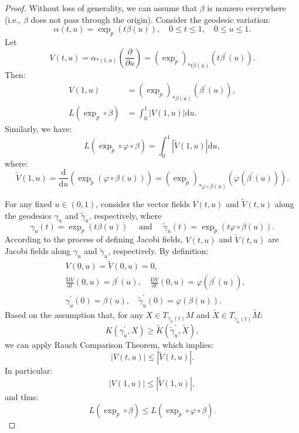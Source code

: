 \documentclass{ctexart}
\begin{document}
\begin{proof}[Proof]
  Without loss of generality, we can assume that $\beta$ is nonzero everywhere (i.e., $\beta$ does not pass through the origin).
  Consider the geodesic variation:
  $$
  \alpha(t, u) = \exp_p(t \beta(u)), \quad 0 \leq t \leq 1, \quad 0 \leq u \leq 1.
  $$
  Let
  $$
  V(t, u) = \alpha_{*(t, u)}\left(\frac{\partial}{\partial u}\right) = \left(\exp_p\right)_{* t \beta(u)}\left(t \beta^{\prime}(u)\right).
  $$
  Then:
  $$
  \begin{aligned}
  V(1, u)  &= \left(\exp_p\right)_{* \beta(u)}\left(\beta^{\prime}(u)\right), \\
  L\left(\exp_p \circ \beta\right) &= \int_0^1|V(1, u)| \mathrm{d} u.
  \end{aligned}
  $$
  Similarly, we have:
  $$
  L\left(\exp_{\tilde{p}} \circ \varphi \circ \beta\right) = \int_0^1|\tilde{V}(1, u)| \mathrm{d} u,
  $$
  where:
  $$
  \tilde{V}(1, u) = \frac{\mathrm{d}}{\mathrm{d} u}\left(\exp_{\tilde{p}}(\varphi \circ \beta(u))\right) = \left(\exp_{\tilde{p}}\right)_{* \varphi \circ \beta(u)}\left(\varphi\left(\beta^{\prime}(u)\right)\right).
  $$

  For any fixed $u \in (0,1)$, consider the vector fields $V(t, u)$ and $\tilde{V}(t, u)$ along the geodesics $\gamma_u$ and $\tilde{\gamma}_u$, respectively, where
  $$
  \gamma_u(t) = \exp_p(t \beta(u)) \quad \text{ and } \quad \tilde{\gamma}_u(t) = \exp_{\tilde{p}}(t \varphi \circ \beta(u)). 
  $$
  According to the process of defining Jacobi fields, $V(t, u)$ and $\tilde{V}(t, u)$ are Jacobi fields along $\gamma_u$ and $\tilde{\gamma}_u$, respectively. By definition:
  $$
  \begin{aligned}
  & V(0, u) = \tilde{V}(0, u) = 0, \\
  & \frac{\mathrm{D} V}{\mathrm{d} t}(0, u) = \beta^{\prime}(u), \quad \frac{\mathrm{D} \tilde{V}}{\mathrm{d} t}(0, u) = \varphi\left(\beta^{\prime}(u)\right), \\
  & \gamma_u^{\prime}(0) = \beta(u), \quad \tilde{\gamma}_u^{\prime}(0) = \varphi(\beta(u)).
  \end{aligned}
  $$
  Based on the assumption that, for any $X \in T_{\gamma_u(t)} M$ and $\tilde{X} \in T_{\tilde{\gamma}_u(t)} \tilde{M}$:
  $$
  K\left(\gamma_u^{\prime}, X\right) \geq \tilde{K}\left(\tilde{\gamma}_u^{\prime}, \tilde{X}\right),
  $$
  we can apply Rauch Comparison Theorem, which implies:
  $$
  |V(t, u)| \leq |\tilde{V}(t, u)|.
  $$
  In particular:
  $$
  |V(1, u)| \leq |\tilde{V}(1, u)|,
  $$
  and thus:
  $$
  L\left(\exp_p \circ \beta\right) \leq L\left(\exp_{\tilde{p}} \circ \varphi \circ \beta\right).
  $$
\end{proof}






\end{document}
